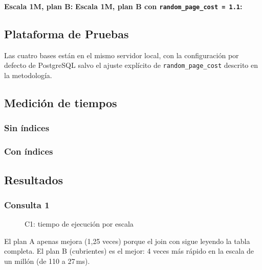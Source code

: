 \noindent\textbf{Escala 1M, plan B:}
\noindent\textbf{Escala 1M, plan B con \texttt{random\_page\_cost = 1.1}:}

\subsection{Plataforma de Pruebas}


Las cuatro bases están en el mismo servidor local, con la configuración por defecto de PostgreSQL salvo el ajuste explícito de \texttt{random\_page\_cost} descrito en la metodología.

\subsection{Medición de tiempos}

\subsubsection{Sin índices}

\subsubsection{Con índices}

\subsection{Resultados}

\subsubsection{Consulta 1}
\begin{figure}[H]\centering{}\caption{C1: tiempo de ejecución por escala}\end{figure}
El plan A apenas mejora (1,25 veces) porque el join con  sigue leyendo la tabla completa. El plan B (cubrientes) es el mejor: 4 veces más rápido en la escala de un millón (de 110 a 27\,ms).

